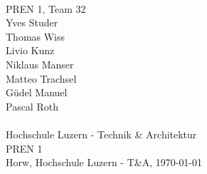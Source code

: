 \begin{titlepage}
    \begin{center}
        \parindent0pt{\Huge\bfseries \myDokumentTyp}\\[0.5cm]
        {\huge PREN 1, Team 32}\\[1cm]
        Yves Studer\\
        Thomas Wiss\\
        Livio Kunz\\
        Niklaus Manser\\
        Matteo Trachsel\\
        Güdel Manuel\\
        Pascal Roth\\
        \vspace*{1cm}
        {\Huge \myTitel}\\[0.5cm]
        
        \vfill{}
        {\normalsize Hochschule Luzern - Technik \& Architektur\\
         PREN 1}\\[0.6cm]
        {\normalsize Horw, Hochschule Luzern - T\&A, \today}
    \end{center}
\end{titlepage}
